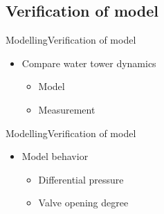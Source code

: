 \subsection{Verification of model}

\begin{frame}{Modelling}{Verification of model}
\begin{itemize}
	\item<1-> Compare water tower dynamics
	\begin{itemize}
	\item<1-> Model
	\item<1-> Measurement
	\end{itemize}
\end{itemize}

\begin{figure}[H]
\centering

\end{figure}


\end{frame}


\begin{frame}{Modelling}{Verification of model}
\begin{itemize}
	\item<1-> Model behavior
	\begin{itemize}
		\item<1-> Differential pressure
		\item<1-> Valve opening degree
	\end{itemize}	
\end{itemize}

\begin{figure}[H]
   \centering
    
\end{figure}

\end{frame}




